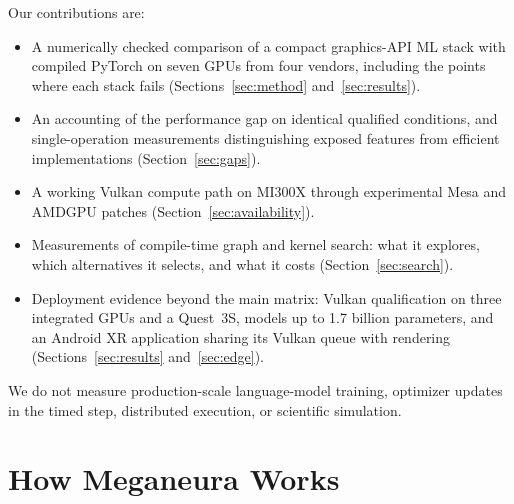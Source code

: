 \documentclass[conference]{IEEEtran}
\newcommand{\system}{Meganeura}
\begin{document}
Our contributions are:
\begin{itemize}
  \item A numerically checked comparison of a compact graphics-API ML stack
        with compiled PyTorch on seven GPUs from four vendors, including the
        points where each stack fails (Sections~\ref{sec:method}
        and~\ref{sec:results}).
  \item An accounting of the performance gap on identical qualified conditions,
        and single-operation measurements distinguishing exposed features
        from efficient implementations (Section~\ref{sec:gaps}).
  \item A working Vulkan compute path on MI300X through experimental Mesa
        and AMDGPU patches (Section~\ref{sec:availability}).
  \item Measurements of compile-time graph and kernel search: what it
        explores, which alternatives it selects, and what it costs
        (Section~\ref{sec:search}).
  \item Deployment evidence beyond the main matrix: Vulkan qualification on
        three integrated GPUs and a Quest~3S, models up to 1.7 billion
        parameters, and an Android XR application sharing its Vulkan queue
        with rendering (Sections~\ref{sec:results} and~\ref{sec:edge}).
\end{itemize}
We do not measure production-scale language-model training, optimizer
updates in the timed step, distributed execution, or scientific simulation.

\section{How \system{} Works}
\label{sec:system}
\end{document}
